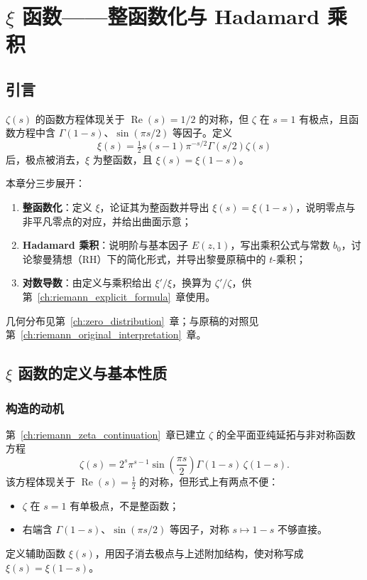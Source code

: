 

\chapter{\texorpdfstring{$\xi$}{xi(s)} 函数——整函数化与 Hadamard 乘积}\label{ch:xi_function}

\section*{引言}\label{sec:intro_xi_function}

$\zeta(s)$ 的函数方程体现关于 $\operatorname{Re}(s)=1/2$ 的对称，但 $\zeta$ 在 $s=1$ 有极点，且函数方程中含 $\Gamma(1-s)$、$\sin(\pi s/2)$ 等因子。定义
\[
\xi(s)=\tfrac12 s(s-1)\pi^{-s/2}\Gamma(s/2)\zeta(s)
\]
后，极点被消去，$\xi$ 为整函数，且 $\xi(s)=\xi(1-s)$。

本章分三步展开：
\begin{enumerate}
  \item \textbf{整函数化}：定义 $\xi$，论证其为整函数并导出 $\xi(s)=\xi(1-s)$，说明零点与非平凡零点的对应，并给出曲面示意；
  \item \textbf{Hadamard 乘积}：说明阶与基本因子 $E(z,1)$，写出乘积公式与常数 $b_0$，讨论黎曼猜想（RH）下的简化形式，并导出黎曼原稿中的 $t$-乘积；
  \item \textbf{对数导数}：由定义与乘积给出 $\xi'/\xi$，换算为 $\zeta'/\zeta$，供第~\ref{ch:riemann_explicit_formula}~章使用。
\end{enumerate}
几何分布见第~\ref{ch:zero_distribution}~章；与原稿的对照见第~\ref{ch:riemann_original_interpretation}~章。

\section{\texorpdfstring{$\xi$}{xi(s)} 函数的定义与基本性质}\label{sec:xi-definition}

\subsection{构造的动机}

第~\ref{ch:riemann_zeta_continuation}~章已建立 $\zeta$ 的全平面亚纯延拓与非对称函数方程
\[
\zeta(s) = 2^s \pi^{s-1} \sin\!\left(\frac{\pi s}{2}\right) \Gamma(1-s)\, \zeta(1-s).
\]
该方程体现关于 $\operatorname{Re}(s)=\frac12$ 的对称，但形式上有两点不便：
\begin{itemize}
    \item $\zeta$ 在 $s=1$ 有单极点，不是整函数；
    \item 右端含 $\Gamma(1-s)$、$\sin(\pi s/2)$ 等因子，对称 $s\mapsto 1-s$ 不够直接。
\end{itemize}
定义辅助函数 $\xi(s)$，用因子消去极点与上述附加结构，使对称写成 $\xi(s)=\xi(1-s)$。


